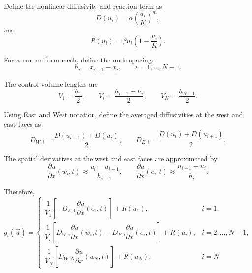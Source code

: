 \documentclass[12pt]{article}
\begin{document}
Define the nonlinear diffusivity and reaction term as
\[
D(u_i)
=
\alpha
\left(
\frac{u_i}{K}
\right)^m,
\]
and
\[
R(u_i)
=
\beta u_i
\left(
1-\frac{u_i}{K}
\right).
\]

For a non-uniform mesh, define the node spacings
\[
h_i
=
x_{i+1}-x_i,
\qquad
i=1,\dots,N-1.
\]

The control volume lengths are
\[
V_1
=
\frac{h_1}{2},
\qquad
V_i
=
\frac{h_{i-1}+h_i}{2},
\qquad
V_N
=
\frac{h_{N-1}}{2}.
\]

Using East and West notation, define the averaged diffusivities at the west and east faces as
\[
D_{W,i}
=
\frac{D(u_{i-1})+D(u_i)}{2},
\qquad
D_{E,i}
=
\frac{D(u_i)+D(u_{i+1})}{2}.
\]

The spatial derivatives at the west and east faces are approximated by
\[
\frac{\partial u}{\partial x}(w_i,t)
\approx
\frac{u_i-u_{i-1}}{h_{i-1}},
\qquad
\frac{\partial u}{\partial x}(e_i,t)
\approx
\frac{u_{i+1}-u_i}{h_i}.
\]

Therefore,
\[
g_i(\vec{u})
=
\begin{cases}
\dfrac{1}{V_1}
\left[
- D_{E,1}
\dfrac{\partial u}{\partial x}(e_1,t)
\right]
+
R(u_1),
& i=1,
\\[12pt]
\dfrac{1}{V_i}
\left[
D_{W,i}
\dfrac{\partial u}{\partial x}(w_i,t)
-
D_{E,i}
\dfrac{\partial u}{\partial x}(e_i,t)
\right]
+
R(u_i),
& i=2,\dots,N-1,
\\[12pt]
\dfrac{1}{V_N}
\left[
D_{W,N}
\dfrac{\partial u}{\partial x}(w_N,t)
\right]
+
R(u_N),
& i=N.
\end{cases}
\]
\end{document}

